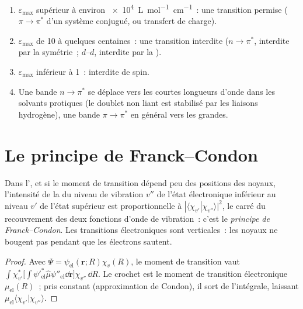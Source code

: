 \begin{method}\label{met:b3:electronic-spectroscopy:assign-band}
\begin{enumerate}
  \item $\varepsilon_{\max}$ supérieur à environ \qty{e4}{L.mol^{-1}.cm^{-1}}~:
        une transition permise ($\pi\to\pi^*$ d'un système conjugué, ou
        transfert de charge).
  \item $\varepsilon_{\max}$ de 10 à quelques centaines~: une transition
        interdite ($n\to\pi^*$,
        interdite par la symétrie~; $d$--$d$, interdite par la ).
  \item $\varepsilon_{\max}$ inférieur à 1~: interdite de spin.
  \item Une bande $n\to\pi^*$ se déplace vers les courtes longueurs
        d'onde dans les solvants protiques (le doublet non liant est
        stabilisé par les liaisons hydrogène), une bande $\pi\to\pi^*$
        en général vers les grandes.
\end{enumerate}
\end{method}

\section{Le principe de Franck--Condon}

\begin{theorem}\label{thm:b3:electronic-spectroscopy:franck-condon}
Dans l', et si le moment de transition
dépend peu des positions des noyaux, l'intensité de la  du niveau de vibration $v''$ de l'état électronique inférieur
au niveau
$v'$ de l'état supérieur est proportionnelle à $|\langle\chi_{v'}|\chi_{v''}\rangle|^2$,
le carré du recouvrement des deux fonctions d'onde de vibration~: c'est
le \emph{principe de Franck--Condon}.
Les transitions électroniques sont verticales~: les noyaux ne bougent pas
pendant que les électrons sautent.
\end{theorem}

\begin{proof}
Avec $\Psi = \psi_{\mathrm{el}}(\mathbf r;R)\chi_v(R)$, le moment de transition vaut
$\int\chi_{v'}^*\big[\int\psi'^*_{\mathrm{el}}\hat\mu\psi''_{\mathrm{el}}\dd\mathbf r\big]
\chi_{v''}\,\dd R$. Le crochet est le moment de transition électronique
$\mu_{\mathrm{el}}(R)$~; pris constant (approximation de Condon), il sort
de l'intégrale, laissant $\mu_{\mathrm{el}}\langle\chi_{v'}|\chi_{v''}\rangle$.
\end{proof}

